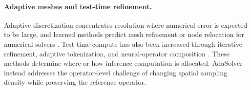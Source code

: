 \paragraph{Adaptive meshes and test-time refinement.}
Adaptive discretization concentrates resolution where numerical error is expected to be large, and learned methods predict mesh refinement or node relocation for numerical solvers \citep{huang2021meshgeneration,obiols2023adarnet,rowbottom2024gadaptivity}. Test-time compute has also been increased through iterative refinement, adaptive tokenization, and neural-operator composition \citep{lippe2023pderefiner,jenkins2026atca,wang2026adaptivetokenization,serrano2026splitting}. These methods determine where or how inference computation is allocated. AdaSolver instead addresses the operator-level challenge of changing spatial sampling density while preserving the reference operator.